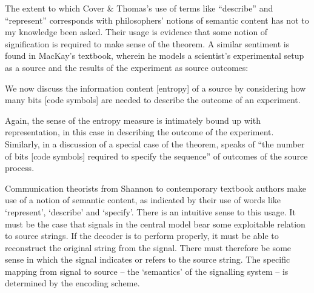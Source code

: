 \noindent The extent to which Cover \& Thomas's use of terms like ``describe'' and ``represent'' corresponds with philosophers' notions of semantic content has not to my knowledge been asked.
Their usage is evidence that some notion of signification is required to make sense of the theorem.
A similar sentiment is found in MacKay's textbook, wherein he models a scientist's experimental setup as a source and the results of the experiment as source outcomes:

\begin{myquote}
We now discuss the information content [entropy] of a source by considering how many bits [code symbols] are needed to describe the outcome of an experiment.
\par\hspace*{\fill}\citet[73]{mackay2003information}
\end{myquote}

\noindent Again, the sense of the entropy measure is intimately bound up with representation, in this case in describing the outcome of the experiment.
Similarly, in a discussion of a special case of the theorem, \citet[397]{shannon1948mathematicalc} speaks of ``the number of bits [code symbols] required to specify the sequence'' of outcomes of the source process.

Communication theorists from Shannon to contemporary textbook authors make use of a notion of semantic content, as indicated by their use of words like `represent', `describe' and `specify'.
There is an intuitive sense to this usage.
It must be the case that signals in the central model bear some exploitable relation to source strings.
If the decoder is to perform properly, it must be able to reconstruct the original string from the signal.
There must therefore be some sense in which the signal indicates or refers to the source string.
The specific mapping from signal to source -- the `semantics' of the signalling system -- is determined by the encoding scheme.

